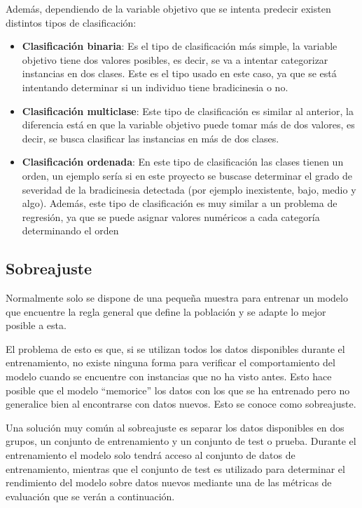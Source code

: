 Además, dependiendo de la variable objetivo que se intenta predecir existen
distintos tipos de clasificación:

\begin{itemize}
    \item \textbf{Clasificación binaria}: Es el tipo de clasificación más
    simple, la variable objetivo tiene dos valores posibles, es decir, se va a
    intentar categorizar instancias en dos clases. Este es el tipo usado en este
    caso, ya que se está intentando determinar si un individuo tiene
    bradicinesia o no.
    \item \textbf{Clasificación multiclase}: Este tipo de clasificación es
    similar al anterior, la diferencia está en que la variable objetivo puede
    tomar más de dos valores, es decir, se busca clasificar las instancias en
    más de dos clases.
    \item \textbf{Clasificación ordenada}: En este tipo de clasificación las
    clases tienen un orden, un ejemplo sería si en este proyecto se buscase
    determinar el grado de severidad de la bradicinesia detectada (por ejemplo
    inexistente, bajo, medio y algo). Además, este tipo de clasificación es muy
    similar a un problema de regresión, ya que se puede asignar valores
    numéricos a cada categoría determinando el orden
\end{itemize}


\subsection{Sobreajuste}

Normalmente solo se dispone de una pequeña muestra para entrenar un modelo que
encuentre la regla general que define la población y se adapte lo mejor posible
a esta.

El problema de esto es que, si se utilizan todos los datos disponibles durante
el entrenamiento, no existe ninguna forma para verificar el comportamiento del
modelo cuando se encuentre con instancias que no ha visto antes. Esto hace
posible que el modelo ``memorice'' los datos con los que se ha entrenado pero no
generalice bien al encontrarse con datos nuevos. Esto se conoce como
sobreajuste.


Una solución muy común al sobreajuste es separar los datos disponibles en dos
grupos, un conjunto de entrenamiento y un conjunto de test o prueba. Durante el
entrenamiento el modelo solo tendrá acceso al conjunto de datos de
entrenamiento, mientras que el conjunto de test es utilizado para determinar el
rendimiento del modelo sobre datos nuevos mediante una de las métricas de
evaluación que se verán a continuación.

